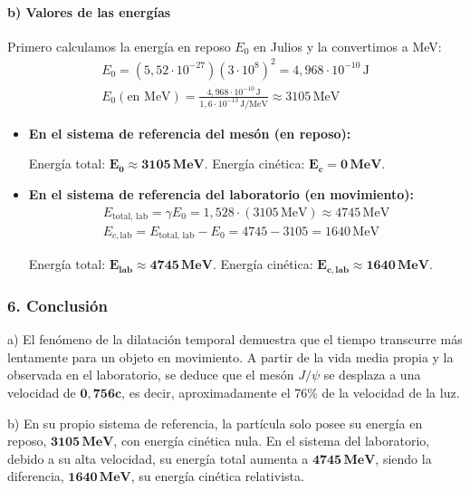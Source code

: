 \paragraph*{b) Valores de las energías}
Primero calculamos la energía en reposo $E_0$ en Julios y la convertimos a MeV:
\begin{gather}
    E_0 = (5,52 \cdot 10^{-27})(3 \cdot 10^8)^2 = 4,968 \cdot 10^{-10} \, \text{J} \nonumber \\
    E_0 (\text{en MeV}) = \frac{4,968 \cdot 10^{-10} \, \text{J}}{1,6 \cdot 10^{-13} \, \text{J/MeV}} \approx 3105 \, \text{MeV}
\end{gather}
\begin{itemize}
    \item \textbf{En el sistema de referencia del mesón (en reposo):}
    \begin{cajaresultado}
        Energía total: $\boldsymbol{E_0 \approx 3105 \, \textbf{MeV}}$. Energía cinética: $\boldsymbol{E_c = 0 \, \textbf{MeV}}$.
    \end{cajaresultado}
    \item \textbf{En el sistema de referencia del laboratorio (en movimiento):}
    \begin{gather}
        E_{\text{total, lab}} = \gamma E_0 = 1,528 \cdot (3105 \, \text{MeV}) \approx 4745 \, \text{MeV} \nonumber \\
        E_{c, \text{lab}} = E_{\text{total, lab}} - E_0 = 4745 - 3105 = 1640 \, \text{MeV} \nonumber
    \end{gather}
    \begin{cajaresultado}
        Energía total: $\boldsymbol{E_{\text{lab}} \approx 4745 \, \textbf{MeV}}$. Energía cinética: $\boldsymbol{E_{c, \text{lab}} \approx 1640 \, \textbf{MeV}}$.
    \end{cajaresultado}
\end{itemize}

\subsubsection*{6. Conclusión}
\begin{cajaconclusion}
    a) El fenómeno de la dilatación temporal demuestra que el tiempo transcurre más lentamente para un objeto en movimiento. A partir de la vida media propia y la observada en el laboratorio, se deduce que el mesón $J/\psi$ se desplaza a una velocidad de $\mathbf{0,756c}$, es decir, aproximadamente el 76\% de la velocidad de la luz.
    
    b) En su propio sistema de referencia, la partícula solo posee su energía en reposo, $\mathbf{3105 \, MeV}$, con energía cinética nula. En el sistema del laboratorio, debido a su alta velocidad, su energía total aumenta a $\mathbf{4745 \, MeV}$, siendo la diferencia, $\mathbf{1640 \, MeV}$, su energía cinética relativista.
\end{cajaconclusion}

\newpage
